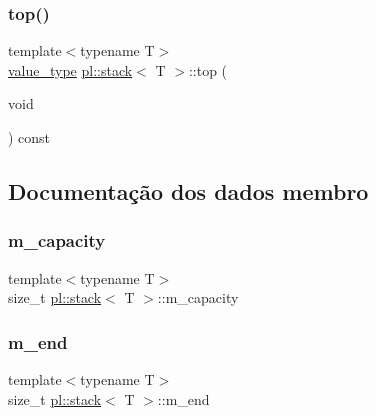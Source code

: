 \mbox{\label{classpl_1_1stack_a3761155a1aeea83b706ae04d416c3608}} 
\subsubsection{\texorpdfstring{top()}{top()}}
{\footnotesize\ttfamily template$<$typename T$>$ \\
\hyperlink{classpl_1_1stack_a2297d235c54cb53f6b8c4be2a324deee}{value\+\_\+type} \hyperlink{classpl_1_1stack}{pl\+::stack}$<$ T $>$\+::top (\begin{DoxyParamCaption}\item[{void}]{ }\end{DoxyParamCaption}) const\hspace{0.3cm}{\ttfamily [inline]}}



\subsection{Documentação dos dados membro}
\mbox{\label{classpl_1_1stack_abfd4b98e0b4fc570fdceb1ebafa4738e}} 
\subsubsection{\texorpdfstring{m\+\_\+capacity}{m\_capacity}}
{\footnotesize\ttfamily template$<$typename T$>$ \\
size\+\_\+t \hyperlink{classpl_1_1stack}{pl\+::stack}$<$ T $>$\+::m\+\_\+capacity\hspace{0.3cm}{\ttfamily [private]}}

\mbox{\label{classpl_1_1stack_ad9bcc4e4ca264cbf14b6f475a7051d82}} 
\subsubsection{\texorpdfstring{m\+\_\+end}{m\_end}}
{\footnotesize\ttfamily template$<$typename T$>$ \\
size\+\_\+t \hyperlink{classpl_1_1stack}{pl\+::stack}$<$ T $>$\+::m\+\_\+end\hspace{0.3cm}{\ttfamily [private]}}

